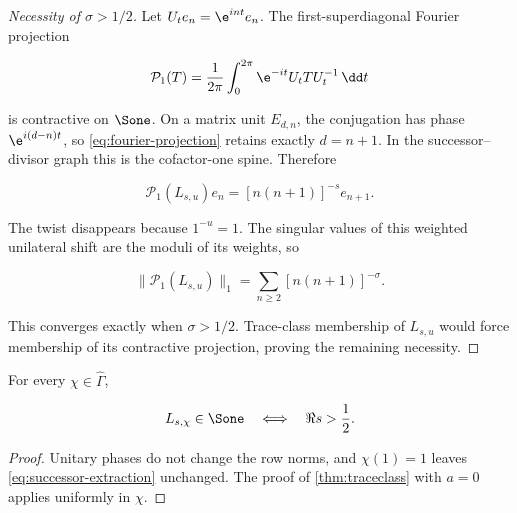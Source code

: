 \begin{proof}[Necessity of \(\sigma>1/2\)]
Let \(U_te_n=\e^{int}e_n\).  The first-superdiagonal Fourier projection

\begin{equation}
 \mathcal P_1(T)=\frac1{2\pi}
 \int_0^{2\pi}\e^{-it}U_tTU_t^{-1}\,\dd t
\label{eq:fourier-projection}
\end{equation}

is contractive on \(\Sone\).  On a matrix unit \(E_{d,n}\), the conjugation
has phase \(\e^{i(d-n)t}\), so \cref{eq:fourier-projection} retains exactly
\(d=n+1\).  In the successor--divisor graph this is the cofactor-one spine.
Therefore

\begin{equation}
 \mathcal P_1(L_{s,u})e_n=
 [n(n+1)]^{-s}e_{n+1}.
\label{eq:successor-extraction}
\end{equation}

The twist disappears because \(1^{-u}=1\).  The singular values of this
weighted unilateral shift are the moduli of its weights, so

\[
 \|\mathcal P_1(L_{s,u})\|_1
 =\sum_{n\ge2}[n(n+1)]^{-\sigma}.
\]

This converges exactly when \(\sigma>1/2\).  Trace-class membership of
\(L_{s,u}\) would force membership of its contractive projection, proving
the remaining necessity.
\end{proof}

\begin{corollary}
\label{cor:character-S1}
For every \(\chi\in\widehat\Gamma\),

\begin{equation}
 L_{s,\chi}\in\Sone
 \quad\Longleftrightarrow\quad
 \Re s>\frac12.
\label{eq:character-domain}
\end{equation}
\end{corollary}

\begin{proof}
Unitary phases do not change the row norms, and
\(\chi(1)=1\) leaves \cref{eq:successor-extraction} unchanged.  The proof of
\cref{thm:traceclass} with \(a=0\) applies uniformly in \(\chi\).
\end{proof}

